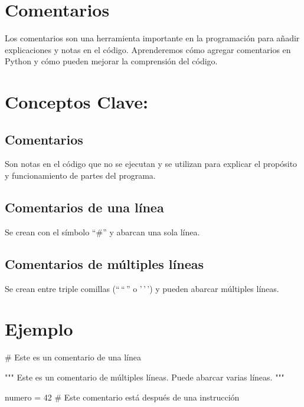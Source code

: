 \documentclass[
  a4paper,
  onepage,
  openany]{scrreprt}
\newenvironment{Shaded}{\begin{snugshade}}{\end{snugshade}}
\newcommand{\CommentTok}[1]{\textcolor[rgb]{0.37,0.37,0.37}{#1}}
\newcommand{\DecValTok}[1]{\textcolor[rgb]{0.68,0.00,0.00}{#1}}
\newcommand{\NormalTok}[1]{\textcolor[rgb]{0.00,0.23,0.31}{#1}}
\newcommand{\OperatorTok}[1]{\textcolor[rgb]{0.37,0.37,0.37}{#1}}
\begin{document}
\hypertarget{comentarios-2}{%
\section{Comentarios}\label{comentarios-2}}

Los comentarios son una herramienta importante en la programación para
añadir explicaciones y notas en el código. Aprenderemos cómo agregar
comentarios en Python y cómo pueden mejorar la comprensión del código.

\hypertarget{conceptos-clave-9}{%
\section{Conceptos Clave:}\label{conceptos-clave-9}}

\hypertarget{comentarios-3}{%
\subsection{Comentarios}\label{comentarios-3}}

Son notas en el código que no se ejecutan y se utilizan para explicar el
propósito y funcionamiento de partes del programa.

\hypertarget{comentarios-de-una-luxednea-1}{%
\subsection{Comentarios de una
línea}\label{comentarios-de-una-luxednea-1}}

Se crean con el símbolo ``\#'' y abarcan una sola línea.

\hypertarget{comentarios-de-muxfaltiples-luxedneas-1}{%
\subsection{Comentarios de múltiples
líneas}\label{comentarios-de-muxfaltiples-luxedneas-1}}

Se crean entre triple comillas (``\,``\,'' o '\,'\,') y pueden abarcar
múltiples líneas.

\hypertarget{ejemplo-9}{%
\section{Ejemplo}\label{ejemplo-9}}

\begin{Shaded}
\begin{Highlighting}[]
\CommentTok{\# Este es un comentario de una línea}

\CommentTok{"""}
\CommentTok{Este es un comentario}
\CommentTok{de múltiples líneas.}
\CommentTok{Puede abarcar varias líneas.}
\CommentTok{"""}

\NormalTok{numero }\OperatorTok{=} \DecValTok{42}  \CommentTok{\# Este comentario está después de una instrucción}
\end{Highlighting}
\end{Shaded}
\end{document}
